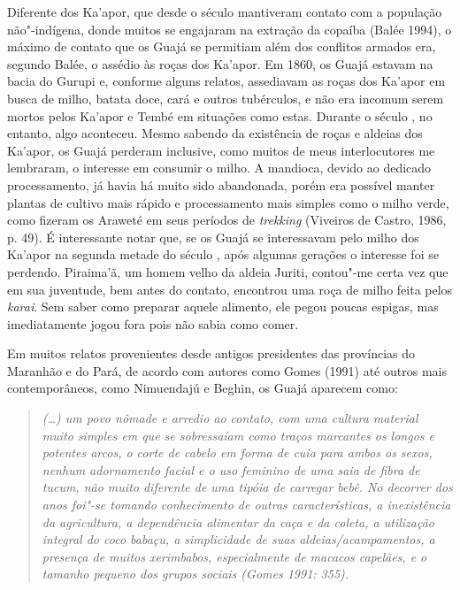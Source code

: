 Diferente dos Ka'apor, que desde o século  mantiveram contato com a
população não"-indígena, donde muitos se engajaram na extração da copaíba
(Balée 1994), o máximo de contato que os Guajá se permitiam além dos
conflitos armados era, segundo Balée, o assédio às roças dos Ka'apor. Em
1860, os Guajá estavam na bacia do Gurupi e, conforme alguns relatos,
assediavam as roças dos Ka'apor em busca de milho, batata doce, cará e
outros tubérculos, e não era incomum serem mortos pelos Ka'apor e Tembé
em situações como estas. Durante o século , no entanto, algo
aconteceu. Mesmo sabendo da existência de roças e aldeias dos Ka'apor,
os Guajá perderam inclusive, como muitos de meus interlocutores me
lembraram, o interesse em consumir o milho. A mandioca, devido ao
dedicado processamento, já havia há muito sido abandonada, porém era
possível manter plantas de cultivo mais rápido e processamento mais
simples como o milho verde, como fizeram os Araweté em seus períodos de
\emph{trekking} (Viveiros de Castro, 1986, p. 49). É interessante notar
que, se os Guajá se interessavam pelo milho dos Ka'apor na segunda
metade do século , após algumas gerações o interesse foi se perdendo.
Piraima'ã, um homem velho da aldeia Juriti, contou"-me certa vez que em
sua juventude, bem antes do contato, encontrou uma roça de milho feita
pelos \emph{karai}. Sem saber como preparar aquele alimento, ele pegou
poucas espigas, mas imediatamente jogou fora pois não sabia como comer.

Em muitos relatos provenientes desde antigos presidentes das províncias
do Maranhão e do Pará, de acordo com autores como Gomes (1991) até
outros mais contemporâneos, como Nimuendajú e Beghin, os Guajá aparecem
como:

\begin{quote}
\emph{(\ldots) um povo nômade e arredio ao contato, com uma cultura material
muito simples em que se sobressaíam como traços marcantes os longos e
potentes arcos, o corte de cabelo em forma de cuia para ambos os sexos,
nenhum adornamento facial e o uso feminino de uma saia de fibra de
tucum, não muito diferente de uma tipóia de carregar bebê. No decorrer
dos anos foi"-se tomando conhecimento de outras características, a
inexistência da agricultura, a dependência alimentar da caça e da
coleta, a utilização integral do coco babaçu, a simplicidade de suas
aldeias/acampamentos, a presença de muitos xerimbabos, especialmente de
macacos capelães, e o tamanho pequeno dos grupos sociais (Gomes 1991:
355).}
\end{quote}

